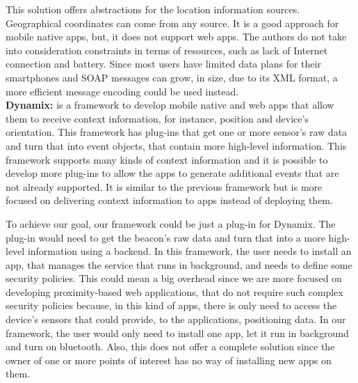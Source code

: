 This solution offers abstractions for the location
information sources. Geographical coordinates can
come from any source. It is a good approach for
mobile native apps, but, it does not support web apps.
The authors do not take into consideration
constraints in terms of resources, such as
lack of Internet connection and battery.
Since most users have limited data plans for
their smartphones and SOAP messages can
grow, in size, due to its XML format,
a more efficient message encoding could be used
instead.
\\
\textbf{Dynamix\cite{Carlson2012}:}
is a framework to develop
mobile native and web apps that allow them to receive
context information, for instance, position and device's
orientation. This framework has plug-ins that get
one or more sensor's raw data and turn that into event
objects, that contain more high-level information.
This framework supports many kinds of context information
and it is possible to develop more plug-ins to allow the
apps to generate additional events that are not
already supported. It is similar to the previous
framework but is more focused on delivering context
information to apps instead of deploying them.

To achieve our goal, our framework could be just a
plug-in for Dynamix. The plug-in would
need to get the beacon's raw data and
turn that into a more high-level information 
using a backend. In this framework,
the user needs to install an app, that manages the service
that runs in background, and needs to define some
security policies. This could mean a big overhead since
we are more focused on developing proximity-based
web applications, that do not require such complex security
policies because, in this kind of apps, there is only need
to access the device's sensors that could provide,
to the applications, positioning data. 
In our framework, the user would only need to
install one app, let it run in background and turn on
bluetooth. Also, this does not offer a complete solution
since the owner of one or more points of interest
has no way of installing new apps on them.

